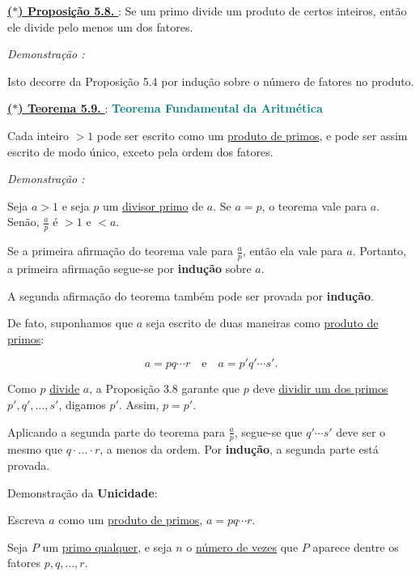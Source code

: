 \vspace{0.2cm}
\noindent\underline{\underline{\textbf{($\ast$) Proposição 5.8. }}} : Se um primo divide um produto de certos inteiros, então ele divide pelo menos um dos fatores.  

\vspace{0.2cm}
\noindent\textit{Demonstração : }

Isto decorre da Proposição 5.4 por indução sobre o número de fatores no produto.

\vspace{0.2cm}
\noindent\underline{\underline{\textbf{($\ast$) Teorema 5.9. }}} : \textbf{\textcolor{teal}{Teorema Fundamental da Aritmética}}

Cada inteiro $> 1$ pode ser escrito como um \underline{produto de primos}, e pode ser assim escrito de modo único, exceto pela ordem dos fatores.

\vspace{0.2cm}
\noindent\textit{Demonstração : }

Seja $a > 1$ e seja $p$ um \underline{divisor primo} de $a$. Se $a = p$, o teorema vale para $a$. Senão, 
$\frac{a}{p}$ é $> 1$ e $< a$. 

Se a primeira afirmação do teorema vale para $\frac{a}{p}$, então ela vale para $a$. Portanto, a primeira afirmação segue-se por \textbf{indução} sobre $a$.  

A segunda afirmação do teorema também pode ser provada por \textbf{indução}. 

De fato, suponhamos que $a$ seja escrito de duas maneiras como \underline{produto de primos}:  

\[
a = pq\cdots r \quad \text{e} \quad a = p' q' \cdots s'.
\]  

Como $p$ \underline{divide} $a$, a Proposição 3.8 garante que $p$ deve \underline{dividir um dos primos} $p', q', \ldots, s'$, 
digamos $p'$. Assim, $p = p'$.  

Aplicando a segunda parte do teorema para $\frac{a}{p}$, segue-se que $q'\cdots s'$ deve ser o mesmo 
que $q \cdot \ldots \cdot r$, a menos da ordem. Por \textbf{indução}, a segunda parte está provada.  

Demonstração da \textbf{Unicidade}: 

Escreva $a$ como um \underline{produto de primos}, $a = pq \cdots r$.  

Seja $P$ um \underline{primo qualquer}, e seja $n$ o \underline{número de vezes} que $P$ aparece dentre os fatores $p,q,\ldots,r$.  

